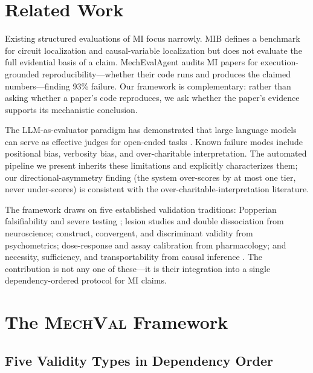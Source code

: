 \documentclass[10pt]{article}
\newcommand{\mechval}{\textsc{MechVal}}
\begin{document}
\section{Related Work}
\label{sec:related}

Existing structured evaluations of MI focus narrowly. MIB \citep{mueller2025mib} defines a benchmark for circuit localization and causal-variable localization but does not evaluate the full evidential basis of a claim. MechEvalAgent \citep{bai2026mecheval} audits MI papers for execution-grounded reproducibility---whether their code runs and produces the claimed numbers---finding 93\% failure. Our framework is complementary: rather than asking whether a paper's code reproduces, we ask whether the paper's evidence supports its mechanistic conclusion.

The LLM-as-evaluator paradigm has demonstrated that large language models can serve as effective judges for open-ended tasks \citep{zheng2024judging}. Known failure modes include positional bias, verbosity bias, and over-charitable interpretation. The automated pipeline we present inherits these limitations and explicitly characterizes them; our directional-asymmetry finding (the system over-scores by at most one tier, never under-scores) is consistent with the over-charitable-interpretation literature.

The framework draws on five established validation traditions: Popperian falsifiability and severe testing \citep{mayo2018statistical}; lesion studies and double dissociation from neuroscience; construct, convergent, and discriminant validity from psychometrics; dose-response and assay calibration from pharmacology; and necessity, sufficiency, and transportability from causal inference \citep{pearl2009causality, pearl2011transportability}. The contribution is not any one of these---it is their integration into a single dependency-ordered protocol for MI claims.

\section{The \mechval{} Framework}
\label{sec:framework}

\subsection{Five Validity Types in Dependency Order}
\label{sec:validity-types}
\end{document}
